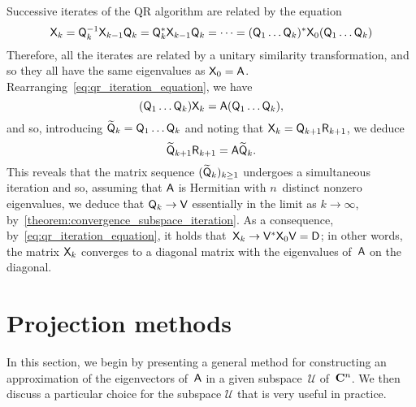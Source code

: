 Successive iterates of the QR algorithm are related by the equation
\begin{equation}
    \label{eq:qr_iteration_equation}
    \mathsf X_{k} = \mathsf Q_k^{-1}  \mathsf X_{k-1} \mathsf Q_k
    = \mathsf Q_k^* \mathsf X_{k-1} \mathsf Q_k
    = \dots = (\mathsf Q_1 \dots \mathsf Q_k)^* \mathsf X_{0} (\mathsf Q_1 \dots \mathsf Q_k)
\end{equation}
Therefore, all the iterates are related by a unitary similarity transformation,
and so they all have the same eigenvalues as $\mathsf X_0 = \mathsf A$.
Rearranging~\eqref{eq:qr_iteration_equation},
we have
\[
    (\mathsf Q_1 \dots \mathsf Q_k) \mathsf X_{k} = \mathsf A (\mathsf Q_1 \dots \mathsf Q_k),
\]
and so, introducing $\widetilde {\mathsf Q}_k = \mathsf Q_1 \dots \mathsf Q_k$
and noting that $\mathsf X_k = \mathsf Q_{k+1} \mathsf R_{k+1}$,
we deduce
\[
    \widetilde {\mathsf Q}_{k+1} \mathsf R_{k+1} = \mathsf A \widetilde {\mathsf Q}_k.
\]
This reveals that
the matrix sequence $(\widetilde{\mathsf Q}_{k})_{k\geq 1}$ undergoes a simultaneous iteration and so,
assuming that $\mathsf A$ is Hermitian with $n$~distinct nonzero eigenvalues,
we deduce that $\mathsf Q_k \to \mathsf V$ essentially in the limit as $k \to \infty$,
by~\cref{theorem:convergence_subspace_iteration}.
As a consequence, by~\eqref{eq:qr_iteration_equation},
it holds that~$\mathsf X_k \to \mathsf V^* \mathsf X_0 \mathsf V = \mathsf D$;
in other words, the matrix $\mathsf X_k$ converges to a diagonal matrix with the eigenvalues of~$\mathsf A$ on the diagonal.

\section{Projection methods}
\label{sec:projection_methods}
In this section,
we begin by presenting a general method for constructing an approximation of the eigenvectors of~$\mathsf A$ in a given subspace~$\mathcal U$ of~$\mathbf C^{n}$.
We then discuss a particular choice for the subspace $\mathcal U$ that is very useful in practice.

